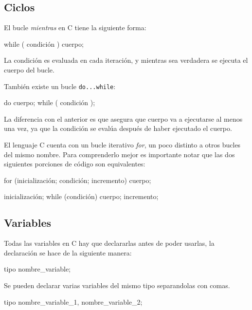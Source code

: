 \subsection{Ciclos}

El bucle \textit{mientras} en C tiene la siguiente forma:

\begin{codigo-c-plano}
while ( condición ) {
    cuerpo;
}
\end{codigo-c-plano}

La condición es evaluada en cada iteración, y mientras sea verdadera se
ejecuta el cuerpo del bucle.

También existe un bucle \lstinline!do...while!:

\begin{codigo-c-plano}
do {
    cuerpo;
} while ( condición );
\end{codigo-c-plano}

La diferencia con el anterior es que asegura que cuerpo va a ejecutarse al
menos una vez, ya que la condición se evalúa después de haber ejecutado el
cuerpo.

El lenguaje C cuenta con un bucle iterativo \textit{for}, un poco distinto a
otros bucles del mismo nombre.  Para comprenderlo mejor es importante notar
que las dos siguientes porciones de código son equivalentes:

\begin{codigo-c-plano}
for (inicialización; condición; incremento) {
    cuerpo;
}
\end{codigo-c-plano}

\begin{codigo-c-plano}
inicialización;
while (condición) {
    { cuerpo; }
    incremento;
}
\end{codigo-c-plano}

\subsection{Variables}

Todas las variables en C hay que declararlas antes de poder usarlas, la
declaración se hace de la siguiente manera:

\begin{codigo-c-plano}
tipo nombre_variable;
\end{codigo-c-plano}

Se pueden declarar varias variables del mismo tipo separandolas con comas.

\begin{codigo-c-plano}
tipo nombre_variable_1, nombre_variable_2;
\end{codigo-c-plano}

